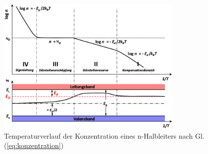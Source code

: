 \documentclass[numbers=noenddot,14pt,a4paper]{scrartcl}
\begin{document}
\begin{figure}[H]
	\centering
	\includegraphics[width=0.8\textwidth]{temperaturverlaufkonzentration.png}
	\caption{Temperaturverlauf der Konzentration eines n-Halbleiters nach Gl. (\ref{eq:konzentration})} \label{img:schemakonzentration}
\end{figure}
\end{document}
